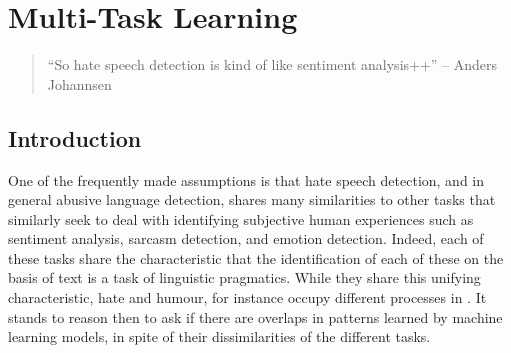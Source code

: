 \ifpdf
    \graphicspath{{Chapter6/Figs/Raster/}{Chapter6/Figs/PDF/}{Chapter6/Figs/}}
\else
    \graphicspath{{Chapter6/Figs/Vector/}{Chapter6/Figs/}}
\fi

\chapter{Multi-Task Learning}\label{chap:mtl}

\begin{quote}
  ``So hate speech detection is kind of like sentiment analysis++'' -- Anders Johannsen
\end{quote}

\section{Introduction}
One of the frequently made assumptions is that hate speech detection, and in general abusive language detection, shares many similarities to other tasks that similarly seek to deal with identifying subjective human experiences such as sentiment analysis, sarcasm detection, and emotion detection. Indeed, each of these tasks share the characteristic that the identification of each of these on the basis of text is a task of linguistic pragmatics. While they share this unifying characteristic, hate and humour, for instance occupy different processes in  \cite{CITE: Cite papers that find things about humour and hate}. It stands to reason then to ask if there are overlaps in patterns learned by machine learning models, in spite of their dissimilarities of the different tasks.

